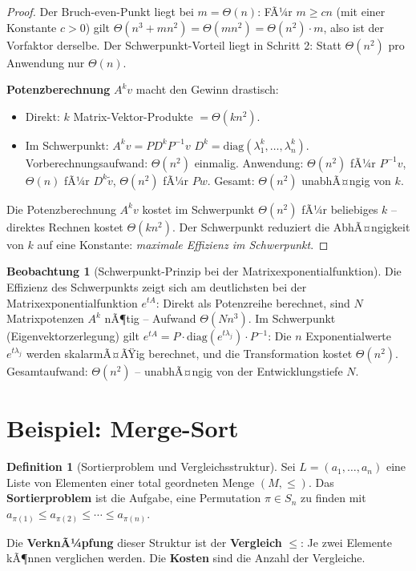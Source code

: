 ﻿\documentclass[a4paper,12pt]{report}
\theoremstyle{definition}
\newtheorem{definition}{Definition}
\newtheorem{beobachtung}{Beobachtung}
\begin{document}
\begin{proof}
    Der Bruch-even-Punkt liegt bei $m = \Theta(n)$: FÃ¼r $m \geq cn$
    (mit einer Konstante $c > 0$) gilt
    $\Theta(n^3 + mn^2) = \Theta(mn^2) = \Theta(n^2) \cdot m$,
    also ist der Vorfaktor derselbe. Der Schwerpunkt-Vorteil liegt
    in Schritt 2: Statt $\Theta(n^2)$ pro Anwendung nur $\Theta(n)$.

    \textbf{Potenzberechnung} $A^k v$ macht den Gewinn drastisch:
    \begin{itemize}
        \item[-] Direkt: $k$ Matrix-Vektor-Produkte $= \Theta(kn^2)$.
        \item[-] Im Schwerpunkt: $A^k v = P D^k P^{-1} v$
              $D^k = \mathrm{diag}(\lambda_1^k, \ldots, \lambda_n^k)$.
              Vorberechnungsaufwand: $\Theta(n^2)$ einmalig.
              Anwendung: $\Theta(n^2)$ fÃ¼r $P^{-1}v$, $\Theta(n)$
              fÃ¼r $D^k \tilde{v}$, $\Theta(n^2)$ fÃ¼r $Pw$.
              Gesamt: $\Theta(n^2)$ unabhÃ¤ngig von $k$.
    \end{itemize}
    Die Potenzberechnung $A^k v$ kostet im Schwerpunkt $\Theta(n^2)$
    fÃ¼r beliebiges $k$ -- direktes Rechnen kostet $\Theta(kn^2)$.
    Der Schwerpunkt reduziert die AbhÃ¤ngigkeit von $k$ auf eine
    Konstante: \emph{maximale Effizienz im Schwerpunkt}.
\end{proof}

\begin{beobachtung}[Schwerpunkt-Prinzip bei der Matrixexponentialfunktion]
    Die Effizienz des Schwerpunkts zeigt sich am deutlichsten bei
    der Matrixexponentialfunktion $e^{tA}$: Direkt als Potenzreihe
    berechnet, sind $N$ Matrixpotenzen $A^k$ nÃ¶tig -- Aufwand
    $\Theta(Nn^3)$. Im Schwerpunkt (Eigenvektorzerlegung) gilt
    $e^{tA} = P \cdot \mathrm{diag}(e^{t\lambda_j}) \cdot P^{-1}$:
    Die $n$ Exponentialwerte $e^{t\lambda_j}$ werden skalarmÃ¤ÃŸig
    berechnet, und die Transformation kostet $\Theta(n^2)$.
    Gesamtaufwand: $\Theta(n^2)$ -- unabhÃ¤ngig von der Entwicklungstiefe $N$.
\end{beobachtung}

\section{Beispiel: Merge-Sort}

\begin{definition}[Sortierproblem und Vergleichsstruktur]
    Sei $L = (a_1, \ldots, a_n)$ eine Liste von Elementen einer
    total geordneten Menge $(M, \leq)$. Das \textbf{Sortierproblem}
    ist die Aufgabe, eine Permutation $\pi \in S_n$ zu finden mit
    $a_{\pi(1)} \leq a_{\pi(2)} \leq \cdots \leq a_{\pi(n)}$.

    Die \textbf{VerknÃ¼pfung} dieser Struktur ist der
    \textbf{Vergleich} $\leq$: Je zwei Elemente kÃ¶nnen verglichen werden.
    Die \textbf{Kosten} sind die Anzahl der Vergleiche.
\end{definition}
\end{document}
